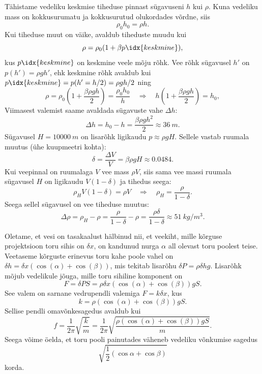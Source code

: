 \documentclass[10pt]{article}
\begin{document}
{%

\solu
\osa Tähistame vedeliku keskmise tiheduse pinnast sügavuseni $h$ kui $\rho$. Kuna vedeliku mass on kokkusurumatu ja kokkusurutud olukordades võrdne, siis
\[
\rho_{0} h_{0}=\rho h.
\]
Kui tiheduse muut on väike, avaldub tiheduste muudu kui
\[
\rho = \rho_0 (1 + \beta p\idx{keskmine}),
\]
kus $p\idx{keskmine}$ on keskmine veele mõju rõhk. Vee rõhk sügavusel $h'$ on $p(h') = \rho gh'$, ehk keskmine rõhk avaldub kui $p\idx{keskmine} = p(h' = h/2) = \rho gh/2$ ning
\[
\rho=\rho_{0}\left(1+\frac{\beta \rho g h}{2}\right)=\frac{\rho_{0} h_{0}}{h} \quad \Rightarrow \quad h\left(1+\frac{\beta \rho g h}{2}\right)=h_{0},
\]
Viimasest valemist saame avaldada sügavuste vahe $\Delta h$:
\[
\Delta h=h_{0}-h=\frac{\beta \rho g h^{2}}{2} \approx \SI{36}{m}.
\]
\osa Sügavusel $H = \SI{10000}{m}$ on lisarõhk ligikaudu $p \approx \rho gH$. Sellele vastab ruumala muutus (ühe kuupmeetri kohta): 
\[
\delta=\frac{\Delta V}{V}=\beta \rho g H \approx \num{0,0484}.
\]
Kui veepinnal on ruumalaga $V$ vee mass $\rho V$, siis sama vee massi ruumala sügavusel $H$ on ligikaudu $V (1 - \delta )$ ja tihedus seega:
\[
\rho_{H} V(1-\delta)=\rho V \quad \Rightarrow \quad \rho_{H}=\frac{\rho}{1-\delta}.
\]
Seega sellel sügavusel on vee tiheduse muutus: 
\[
\Delta \rho=\rho_{H}-\rho=\frac{\rho}{1-\delta}-\rho=\frac{\rho \delta}{1-\delta} \approx \SI{51}{kg/m^3}.
\]
\probend
\bigskip


\solu
Oletame, et vesi on tasakaalust hälbinud nii, et veekiht, mille kõrguse projektsioon toru sihis on $\delta x$, on kandunud nurga $\alpha$ all olevast toru poolest teise. Veetaseme kõrguste erinevus toru kahe poole vahel on $\delta h = \delta x (\cos (\alpha ) + \cos (\beta ))$, mis tekitab lisarõhu $\delta P = \rho \delta hg$. Lisarõhk mõjub vedelikule jõuga, mille toru sihiline komponent on
\[
F = \delta P S = \rho \delta x (\cos (\alpha ) + \cos (\beta )) gS.
\]
See valem on sarnane vedrupendli valemiga $F = k\delta x$, kus 
\[
k = \rho (\cos (\alpha ) + \cos (\beta )) gS.
\]
Sellise pendli omavõnkesagedus avaldub kui
\[
f = \frac{1}{2\pi} \sqrt{\frac{k}{m}} = \frac{1}{2\pi} \sqrt{\frac{\rho(\cos(\alpha)+\cos(\beta))gS}{m}}.
\]
Seega võime öelda, et toru pooli painutades väheneb vedeliku võnkumise sagedus
\[
\sqrt{\frac{1}{2}(\cos \alpha + \cos \beta)}
\]
korda.
\probend
\bigskip
\newpage
}
\end{document}
